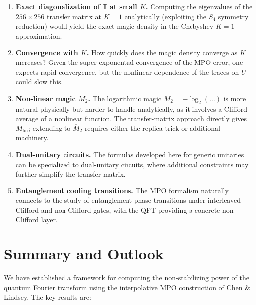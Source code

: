 \documentclass[11pt,a4paper]{article}
\theoremstyle{definition}
\theoremstyle{remark}
\newcommand{\Mlin}{M_{\mathrm{lin}}}
\newcommand{\Mtwo}{\overline{M}_2}
\begin{document}
\begin{enumerate}[label=\arabic*.]
  \item \textbf{Exact diagonalization of $\mathbb{T}$ at small $K$.}
  Computing the eigenvalues of the $256\times 256$ transfer matrix at $K=1$ analytically (exploiting the $S_4$ symmetry reduction) would yield the exact magic density in the Chebyshev-$K=1$ approximation.

  \item \textbf{Convergence with $K$.}
  How quickly does the magic density converge as $K$ increases?  Given the super-exponential convergence of the MPO error, one expects rapid convergence, but the nonlinear dependence of the traces on $U$ could slow this.

  \item \textbf{Non-linear magic $\Mtwo$.}
  The logarithmic magic $\Mtwo = -\log_2(\ldots)$ is more natural physically but harder to handle analytically, as it involves a Clifford average of a nonlinear function.  The transfer-matrix approach directly gives $\Mlin$; extending to $\Mtwo$ requires either the replica trick or additional machinery.

  \item \textbf{Dual-unitary circuits.}
  The formulas developed here for generic unitaries can be specialized to dual-unitary circuits, where additional constraints may further simplify the transfer matrix.

  \item \textbf{Entanglement cooling transitions.}
  The MPO formalism naturally connects to the study of entanglement phase transitions under interleaved Clifford and non-Clifford gates, with the QFT providing a concrete non-Clifford layer.
\end{enumerate}

\section{Summary and Outlook}
\label{sec:summary}

We have established a framework for computing the non-stabilizing power of the quantum Fourier transform using the interpolative MPO construction of Chen \& Lindsey.  The key results are:
\end{document}
